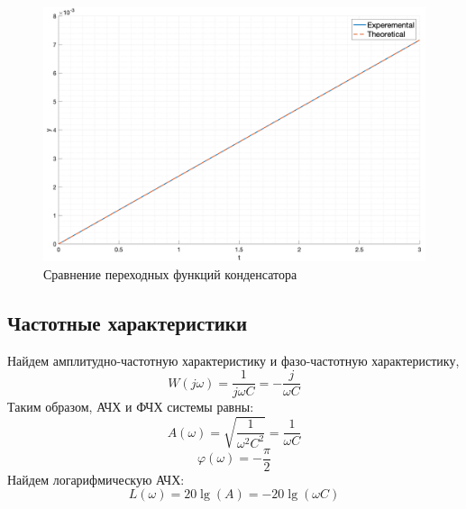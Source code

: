 \begin{figure}[ht!]
    \centering
    \includegraphics[width=\textwidth]{media/plots/task3_step_response_cmp.png}
    \caption{Сравнение переходных функций конденсатора}
    \label{fig:task3_step_response_cmp}
\end{figure}

\FloatBarrier
\subsection{Частотные характеристики}
\noindent Найдем амплитудно-частотную характеристику и фазо-частотную характеристику,
\begin{equation}
    W(j\omega) = \frac{1}{j\omega C} = -\frac{j}{\omega C}
\end{equation}
Таким образом, АЧХ и ФЧХ системы равны:
\begin{equation}
    A(\omega) = \sqrt{\frac{1}{\omega^2C^2}} = \frac{1}{\omega C}
\end{equation}
\begin{equation}
    \varphi(\omega) = -\frac{\pi}{2}
\end{equation}
Найдем логарифмическую АЧХ: 
\begin{equation}
    L(\omega) = 20\lg(A) = -20\lg(\omega C)
\end{equation}

